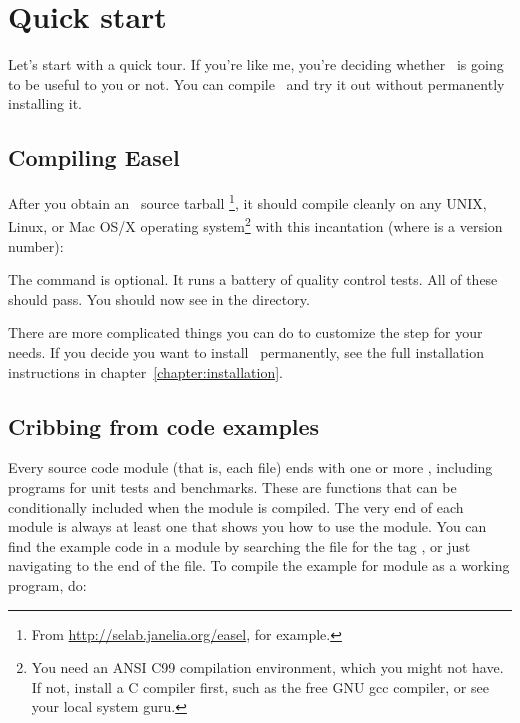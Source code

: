 \section{Quick start}

Let's start with a quick tour. If you're like me, you're deciding
whether \Easel\ is going to be useful to you or not. You can compile
\Easel\ and try it out without permanently installing it.

\subsection{Compiling Easel}

After you obtain an \Easel\ source tarball
\footnote{From \url{http://selab.janelia.org/easel}, for example.}, it
should compile cleanly on any UNIX, Linux, or Mac OS/X operating
system\footnote{You need an ANSI C99 compilation environment, which you might
not have. If not, install a C compiler first, such as the free GNU gcc
compiler, or see your local system guru.} with this incantation (where
 is a version number):

\begin{cchunk}
\end{cchunk}

The  command is optional. It runs a battery of
quality control tests. All of these should pass. You should now see
 in the directory.

There are more complicated things you can do to customize the
 step for your needs. If you decide you want to
install \Easel\ permanently, see the full installation instructions in
chapter~\ref{chapter:installation}.

\subsection{Cribbing from code examples}

Every source code module (that is, each  file) ends with one
or more , including programs for unit tests
and benchmarks. These are  functions that can be
conditionally included when the module is compiled. The very end of
each module is always at least one  that shows
you how to use the module. You can find the example code in a module
 by searching the  file for the tag
, or just navigating to the end of the file. To
compile the example for module  as a working program, do:

